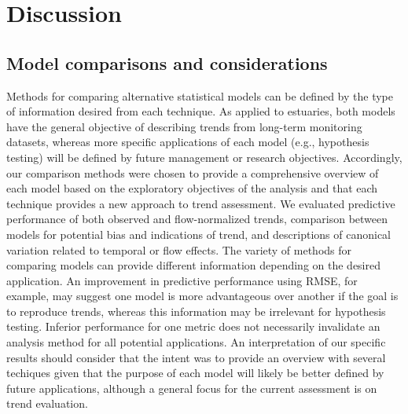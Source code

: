 \documentclass[letterpaper,12pt,oneside]{article}\usepackage[]{graphicx}\usepackage[]{color}
\begin{document}
\section{Discussion}

\subsection{Model comparisons and considerations}

Methods for comparing alternative statistical models can be defined by the type of information desired from each technique.  As applied to estuaries, both models have the general objective of describing trends from long-term monitoring datasets, whereas more specific applications of each model (e.g., hypothesis testing) will be defined by future management or research objectives.  Accordingly, our comparison methods were chosen to provide a comprehensive overview of each model based on the exploratory objectives of the analysis and that each technique provides a new approach to trend assessment.  We evaluated predictive performance of both observed and flow-normalized trends, comparison between models for potential bias and indications of trend, and descriptions of canonical variation related to temporal or flow effects.  The variety of methods for comparing models can provide different information depending on the desired application.  An improvement in predictive performance using \ac{RMSE}, for example, may suggest one model is more advantageous over another if the goal is to reproduce trends, whereas this information may be irrelevant for hypothesis testing. Inferior performance for one metric does not necessarily invalidate an analysis method for all potential applications.  An interpretation of our specific results should consider that the intent was to provide an overview with several techiques given that the purpose of each model will likely be better defined by future applications, although a general focus for the current assessment is on trend evaluation.   
\end{document}
